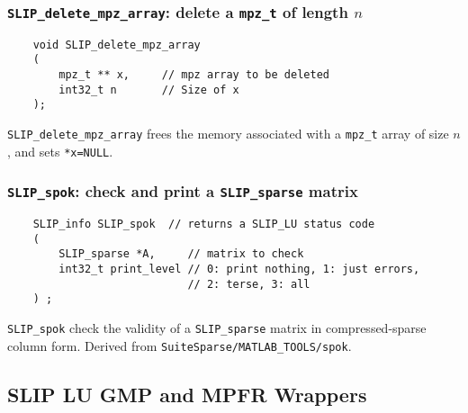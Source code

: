 \documentclass[12pt]{article}
\theoremstyle{definition}
\begin{document}
\cprotect\subsubsection{\verb|SLIP_delete_mpz_array|: delete a \verb|mpz_t| of length $n$}

\begin{mdframed}[userdefinedwidth=6in]
{\footnotesize
\begin{verbatim}
    void SLIP_delete_mpz_array
    (
        mpz_t ** x,     // mpz array to be deleted
        int32_t n       // Size of x
    );
\end{verbatim}
} \end{mdframed}

\verb|SLIP_delete_mpz_array| frees the memory associated with a \verb|mpz_t|
array of size $n$, and sets \verb|*x=NULL|.

\cprotect\subsubsection{\verb|SLIP_spok|: check and print a \verb|SLIP_sparse| matrix}

\begin{mdframed}[userdefinedwidth=6in]
{\footnotesize
\begin{verbatim}
    SLIP_info SLIP_spok  // returns a SLIP_LU status code
    (
        SLIP_sparse *A,     // matrix to check
        int32_t print_level // 0: print nothing, 1: just errors,
                            // 2: terse, 3: all
    ) ;
\end{verbatim}
} \end{mdframed}

\verb|SLIP_spok| check the validity of a \verb|SLIP_sparse| matrix in compressed-sparse column form.  Derived from \verb|SuiteSparse/MATLAB_TOOLS/spok|.

\subsection{SLIP LU GMP and MPFR Wrappers}
\end{document}
